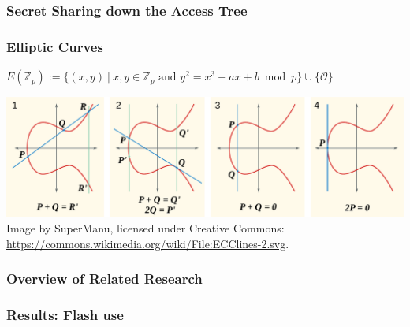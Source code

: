 \begin{frame}
    \frametitle{Secret Sharing down the Access Tree}
    
\end{frame}

\begin{frame}[c]
    \frametitle{Elliptic Curves}
    \begin{center}
        \Large
        $E(\mathbb{Z}_p) := \{(x, y)~|~x,y \in \mathbb{Z}_p \text{ and } y^2 = x^3 + a x + b \bmod{p}\} \cup \{\mathcal{O}\}$
    \end{center}
    \includegraphics[width=\textwidth]{../thesis/figures/ecc_point_addition.pdf}
    Image by SuperManu, licensed under Creative Commons: \url{https://commons.wikimedia.org/wiki/File:ECClines-2.svg}.
\end{frame}

\begin{frame}[c]
    \frametitle{Overview of Related Research}
    \begin{center}
        
    \end{center}
\end{frame}

\begin{frame}
    \frametitle{Results: Flash use}
    \centering
    
\end{frame}

